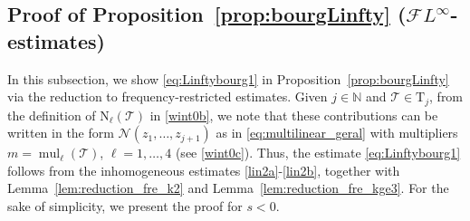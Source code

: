 \documentclass[%
11pt,  reqno]{amsart}
\newcommand{\jap}[1]{\langle #1 \rangle}
\newcommand{\5}{\textup{V}}
\newcommand{\FL}{\mathcal{F} L}
\newcommand{\ind}{\mathbbm 1}
\newcommand{\wt}{\widetilde}
\theoremstyle{remark}
\newcommand{\bul}{\bullet}
\newcommand{\TT}{\mathcal{T}}
\newcommand{\Tr}{\mathrm{T}}
\newcommand{\al}{\alpha}
\newcommand{\G}{\Gamma}
\newcommand{\bfrak}{\mathfrak{b}}
\newcommand{\gfrak}{\mathfrak{g}}
\newcommand{\ta}{\theta}
\renewcommand{\l}{\ell}
\newcommand{\N}{\mathbb{N}}
\DeclareMathOperator{\mul}{mul}
\numberwithin{equation}{section}
\numberwithin{theorem}{section}
\newcommand{\NN}{\mathrm{N}}
\newcommand{\Ncal}{\mathcal{N}}
\begin{document}





\subsection{Proof of Proposition~\ref{prop:bourgLinfty} ($\FL^\infty$-estimates)}
\label{SUB:Linfty}



In this subsection, we show \eqref{eq:Linftybourg1} in Proposition~\ref{prop:bourgLinfty} via the reduction to frequency-restricted estimates. 
Given $j\in\N$ and $\TT\in \Tr_j$, from the definition of $\NN_\l(\TT)$  in \eqref{wint0b}, we note that these contributions can be written in the form $\Ncal(z_1, \ldots, z_{j+1})$ as 
in \eqref{eq:multilinear_geral}
with multipliers $m = \mul_\l(\TT)$, $\l=1, \ldots, 4$ (see \eqref{wint0c}). Thus, the estimate  \eqref{eq:Linftybourg1}  follows from the inhomogeneous estimates \eqref{lin2a}-\eqref{lin2b}, together with Lemma~\ref{lem:reduction_fre_k2} and Lemma~\ref{lem:reduction_fre_kge3}. For the sake of simplicity, we present the proof for $s<0$.
\end{document}
